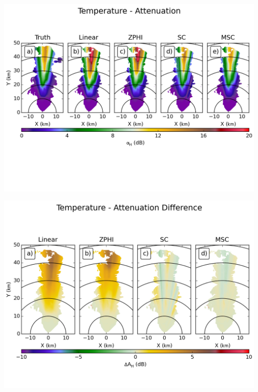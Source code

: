 \documentclass[red]{beamer}
\begin{document}
\begin{frame}
	\begin{center}
		\includegraphics[scale=0.55]{figures/C_Temperature_Attenuation.png}
	\end{center}
\end{frame}

\begin{frame}
	\begin{center}
		\includegraphics[scale=0.45]{figures/C_Temperature_Attenuation_Difference.png}
	\end{center}
\end{frame}
\end{document}
